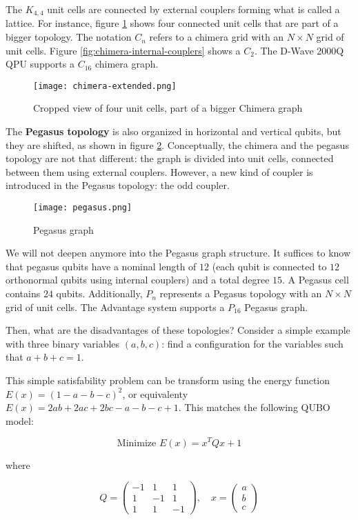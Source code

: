 The $K_{4,4}$ unit cells are connected by external couplers forming what is called a lattice. For instance, figure \ref{fig:chimera-extended} shows four connected unit cells that are part of a bigger topology. The notation $C_n$ refers to a chimera grid with an $N \times N$ grid of unit cells. Figure \ref{fig:chimera-internal-couplers} shows a $C_2$. The D-Wave 2000Q QPU supports a $C_16$ chimera graph.

\begin{figure}[h]
	\texttt{[image: chimera-extended.png]}
	\centering
	\caption{Cropped view of four unit cells, part of a bigger Chimera graph \cite{DWaveDoc-Architecture}}
	\label{fig:chimera-extended}
\end{figure}

The \textbf{Pegasus topology} is also organized in horizontal and vertical qubits, but they are shifted, as shown in figure \ref{fig:pegasus}. Conceptually, the chimera and the pegasus topology are not that different: the graph is divided into unit cells, connected between them using external couplers. However, a new kind of coupler is introduced in the Pegasus topology: the odd coupler.

\begin{figure}[h]
	\texttt{[image: pegasus.png]}
	\centering
	\caption{Pegasus graph \cite{DWaveDoc-Architecture}}
	\label{fig:pegasus}
\end{figure}

We will not deepen anymore into the Pegasus graph structure. It suffices to know that pegasus qubits have a nominal length of $12$ (each qubit is connected to $12$ orthonormal qubits using internal couplers) and a total degree $15$. A Pegasus cell contains $24$ qubits. Additionally, $P_n$ represents a Pegasus topology with an $N \times N$ grid of unit cells. The Advantage system supports a $P_{16}$ Pegasus graph.

Then, what are the disadvantages of these topologies? Consider a simple example with three binary variables $(a, b, c)$: find a configuration for the variables such that $a + b + c = 1$.

This simple satisfability problem can be transform using the energy function $E(x) = (1 - a - b - c)^2$, or equivalenty $E(x) = 2ab + 2ac + 2bc - a - b - c + 1$. This matches the following QUBO model:

$$ \text{Minimize } E(x) = x^T Q x + 1$$

where

$$
Q = 
\left(
\begin{array}{ccc}
	-1 & 1 & 1  \\
	1 & -1 & 1  \\
	1 & 1 & -1
\end{array}
\right), \quad
x = 
\left(
\begin{array}{c}
a  \\
b  \\
c
\end{array}
\right)
$$

